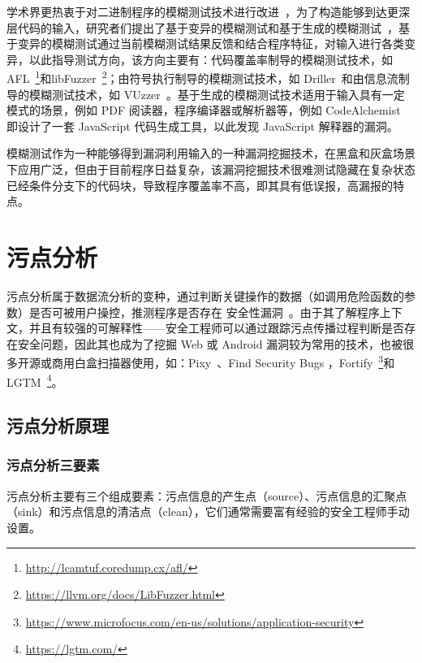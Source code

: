 学术界更热衷于对二进制程序的模糊测试技术进行改进~\cite{artoffuzz}，为了构造能够到达更深层代码的输入，研究者们提出了基于变异的模糊测试和基于生成的模糊测试~\cite{Zou2018}，基于变异的模糊测试通过当前模糊测试结果反馈和结合程序特征，对输入进行各类变异，以此指导测试方向，该方向主要有：代码覆盖率制导的模糊测试技术，如 AFL~\footnote{\url{http://lcamtuf.coredump.cx/afl/}}和libFuzzer~\footnote{\url{https://llvm.org/docs/LibFuzzer.html}}；由符号执行制导的模糊测试技术，如 Driller~\cite{Driller}和由信息流制导的模糊测试技术，如 VUzzer~\cite{VUzzer}。基于生成的模糊测试技术适用于输入具有一定模式的场景，例如 PDF 阅读器，程序编译器或解析器等，例如 CodeAlchemist~\cite{CodeAlchemist} 即设计了一套 JavaScript 代码生成工具，以此发现 JavaScript 解释器的漏洞。

模糊测试作为一种能够得到漏洞利用输入的一种漏洞挖掘技术，在黑盒和灰盒场景下应用广泛，但由于目前程序日益复杂，该漏洞挖掘技术很难测试隐藏在复杂状态已经条件分支下的代码块，导致程序覆盖率不高，即其具有低误报，高漏报的特点。

\section{污点分析}
污点分析属于数据流分析的变种，通过判断关键操作的数据（如调用危险函数的参数）是否可被用户操控，推测程序是否存在 安全性漏洞~\cite{taint:wanglei}。由于其了解程序上下文，并且有较强的可解释性——安全工程师可以通过跟踪污点传播过程判断是否存在安全问题，因此其也成为了挖掘 Web 或 Android 漏洞较为常用的技术，也被很多开源或商用白盒扫描器使用，如：Pixy~\cite{pixy}、Find Security Bugs ，Fortify~\footnote{\url{https://www.microfocus.com/en-us/solutions/application-security}}和LGTM~\footnote{\url{https://lgtm.com/}}。\\

\subsection{污点分析原理}

\subsubsection{污点分析三要素}
污点分析主要有三个组成要素：污点信息的产生点（source）、污点信息的汇聚点（sink）和污点信息的清洁点（clean），它们通常需要富有经验的安全工程师手动设置。

